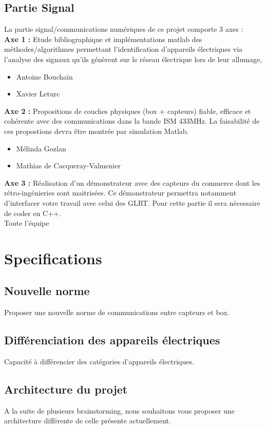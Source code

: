 \documentclass[10pt,a4paper]{article}
\begin{document}
\subsection{Partie Signal}
La partie signal/communications numériques de ce projet comporte 3 axes :\\
\textbf{Axe 1 :} Etude bibliographique et implémentations matlab des méthodes/algorithmes permettant l’identification
d’appareils électriques via l’analyse des signaux qu’ils génèrent sur le réseau électrique lors de leur allumage,
\begin{itemize}
\item Antoine Bouchain
\item Xavier Leturc
\end{itemize}
\textbf{Axe 2 :} Propositions de couches physiques (box + capteurs) fiable, efficace et cohérente avec des communications
dans la bande ISM 433MHz. La faisabilité de ces propostions devra être montrée par simulation Matlab.
\begin{itemize}
\item Mélinda Gozlan
\item Mathias de Cacqueray-Valmenier
\end{itemize}
\textbf{Axe 3 :} Réalisation d’un démonstrateur avec des capteurs du commerce dont les rétro-ingénieries sont maitrisées.
Ce démonstrateur permettra notamment d’interfacer votre travail avec celui des GLRT. Pour cette partie il sera
nécessaire de coder en C++. \\
Toute l'équipe
\newpage
\section{Specifications}
\subsection{Nouvelle norme}
Proposer une nouvelle norme de communications entre capteurs et box.
\subsection{Différenciation des appareils électriques}
Capacité à différencier des catégories d'appareils électriques.
\subsection{Architecture du projet}
A la suite de plusieurs brainstorming, nous souhaitons vous proposer une architecture différente de celle présente actuellement.
\end{document}
